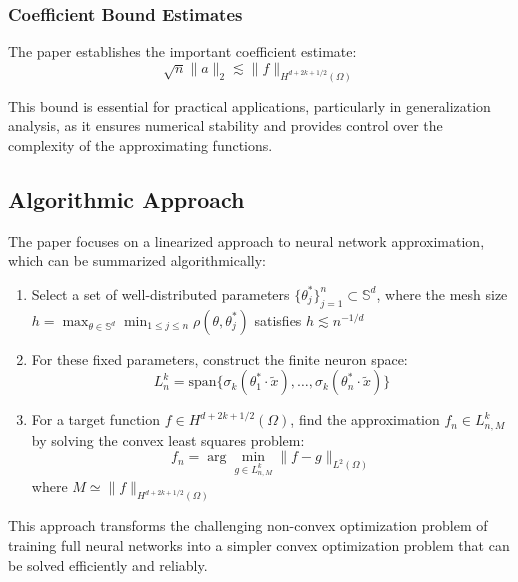 \documentclass[11pt]{article}
\begin{document}
\subsubsection{Coefficient Bound Estimates}

The paper establishes the important coefficient estimate:
\begin{equation}
\sqrt{n}\|a\|_2 \lesssim \|f\|_{H^{d+2k+1/2}(\Omega)}
\end{equation}

This bound is essential for practical applications, particularly in generalization analysis, as it ensures numerical stability and provides control over the complexity of the approximating functions.

\subsection{Algorithmic Approach}

The paper focuses on a linearized approach to neural network approximation, which can be summarized algorithmically:

\begin{enumerate}
    \item Select a set of well-distributed parameters $\{\theta_j^*\}_{j=1}^n \subset \mathbb{S}^d$, where the mesh size $h = \max_{\theta \in \mathbb{S}^d} \min_{1 \leq j \leq n} \rho(\theta, \theta_j^*)$ satisfies $h \lesssim n^{-1/d}$
    
    \item For these fixed parameters, construct the finite neuron space:
    \begin{equation}
    L_n^k = \text{span}\{\sigma_k(\theta_1^* \cdot \tilde{x}), \ldots, \sigma_k(\theta_n^* \cdot \tilde{x})\}
    \end{equation}
    
    \item For a target function $f \in H^{d+2k+1/2}(\Omega)$, find the approximation $f_n \in L_{n,M}^k$ by solving the convex least squares problem:
    \begin{equation}
    f_n = \arg\min_{g \in L_{n,M}^k} \|f - g\|_{L^2(\Omega)}
    \end{equation}
    where $M \simeq \|f\|_{H^{d+2k+1/2}(\Omega)}$
\end{enumerate}

This approach transforms the challenging non-convex optimization problem of training full neural networks into a simpler convex optimization problem that can be solved efficiently and reliably.
\end{document}

